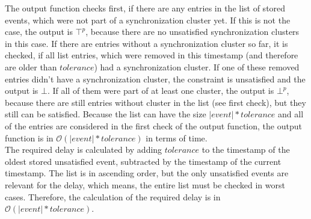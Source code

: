 	The output function checks first, if there are any entries in the list of stored events, which were not part of a synchronization cluster yet. If this is not the case, the output is $\top^p$, because there are no unsatisfied synchronization clusters in this case. If there are entries without a synchronization cluster so far, it is checked, if all list entries, which were removed in this timestamp (and therefore are older than $tolerance$) had a synchronization cluster. If one of these removed entries didn't have a synchronization cluster, the constraint is unsatisfied and the output is $\bot$. If all of them were part of at least one cluster, the output is $\bot^p$, because there are still entries without cluster in the list (see first check), but they still can be satisfied. Because the list can have the size $|event|*tolerance$ and all of the entries are considered in the first check of the output function, the output function is in $\mathcal{O}(|event|*tolerance)$ in terms of time.\\
	The required delay is calculated by adding $tolerance$ to the timestamp of the oldest stored unsatisfied event, subtracted by the timestamp of the current timestamp. The list is in ascending order, but the only unsatisfied events are relevant for the delay, which means, the entire list must be checked in worst cases. Therefore, the calculation of the required delay is in $\mathcal{O}(|event|*tolerance)$.
	
